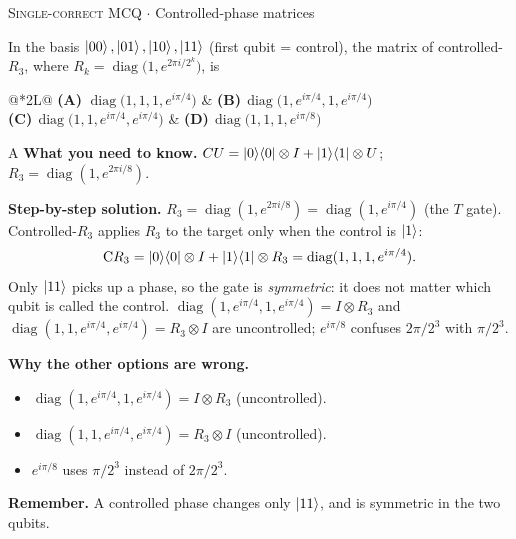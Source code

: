 \documentclass[11pt,a4paper]{article}
\newcommand{\optlabel}[1]{\textbf{(#1)}}
\newcommand{\correctlabel}[1]{\textcolor{okgreen}{\textbf{(#1)}\,\ding{51}}}
\newenvironment{qitem}[1]{\begin{list}{}{\setlength{\leftmargin}{3.3em}\setlength{\labelwidth}{3.1em}%
  \setlength{\labelsep}{0.2em}\setlength{\topsep}{3pt}\setlength{\parsep}{3pt}}\item[\textbf{Q.#1}\hfill]}{\end{list}}
\newcommand{\qsep}{\par\vspace{2pt}{\color{black!15}\hrule}\vspace{4pt}}
\newcommand{\qmeta}[2]{{\footnotesize\color{black!60}\textsc{#1} \;$\cdot$\; #2}\par}
\begin{document}
\begin{qitem}{27}
\qmeta{Single-correct MCQ}{Controlled-phase matrices}
In the basis $\ket{00}, \ket{01}, \ket{10}, \ket{11}$ (first qubit = control), the matrix of controlled-$R_3$, where
$R_k = \operatorname{diag}\big(1, e^{2\pi i/2^k}\big)$, is
\par\smallskip\noindent\begin{tabularx}{\linewidth}{@{}*{2}{L}@{}}
\correctlabel{A}\,$\operatorname{diag}\big(1, 1, 1, e^{i\pi/4}\big)$ & \optlabel{B}\,$\operatorname{diag}\big(1, e^{i\pi/4}, 1, e^{i\pi/4}\big)$ \\[3pt]
\optlabel{C}\,$\operatorname{diag}\big(1, 1, e^{i\pi/4}, e^{i\pi/4}\big)$ & \optlabel{D}\,$\operatorname{diag}\big(1, 1, 1, e^{i\pi/8}\big)$
\end{tabularx}
\end{qitem}
\begin{solbox}{A}
\textbf{\color{brand}What you need to know.} $CU = \ket0\!\bra0\otimes I + \ket1\!\bra1\otimes U$; $R_3 = \operatorname{diag}(1, e^{2\pi i/8})$.

\textbf{\color{brand}Step-by-step solution.} $R_3 = \operatorname{diag}(1, e^{2\pi i/8}) = \operatorname{diag}(1, e^{i\pi/4})$ (the $T$ gate). Controlled-$R_3$ applies $R_3$
to the target only when the control is $\ket1$:
\[ \mathrm{C}R_3 = \ket0\!\bra0 \otimes I + \ket1\!\bra1 \otimes R_3 = \operatorname{diag}(1, 1, 1, e^{i\pi/4}). \]
Only $\ket{11}$ picks up a phase, so the gate is \emph{symmetric}: it does not matter which qubit is called the control.
$\operatorname{diag}(1, e^{i\pi/4}, 1, e^{i\pi/4}) = I\otimes R_3$ and $\operatorname{diag}(1,1,e^{i\pi/4},e^{i\pi/4}) = R_3 \otimes I$ are
uncontrolled; $e^{i\pi/8}$ confuses $2\pi/2^3$ with $\pi/2^3$.

\textbf{\color{brand}Why the other options are wrong.}
\begin{itemize}[leftmargin=2.4em, itemsep=1pt, topsep=2pt]
\item[\textbf{(B)}] $\operatorname{diag}(1,e^{i\pi/4},1,e^{i\pi/4}) = I\otimes R_3$ (uncontrolled).
\item[\textbf{(C)}] $\operatorname{diag}(1,1,e^{i\pi/4},e^{i\pi/4}) = R_3\otimes I$ (uncontrolled).
\item[\textbf{(D)}] $e^{i\pi/8}$ uses $\pi/2^3$ instead of $2\pi/2^3$.
\end{itemize}
\textbf{\color{brand}Remember.} A controlled phase changes only $\ket{11}$, and is symmetric in the two qubits.
\end{solbox}
\qsep
\end{document}
